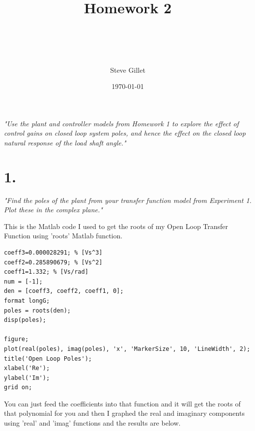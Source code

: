 \documentclass{article}
\title{Homework 2 \\ \className \\ \professorName \\ \taName}
\author{Steve Gillet}
\date{\today}
\begin{document}
\maketitle
\textit{
    "Use the plant and controller models from Homework 1 to explore the effect of control gains on
    closed loop system poles, and hence the effect on the closed loop natural response of the load
    shaft angle."
}

\section*{1.}

\textit{
    "Find the poles of the plant from your transfer function model from Experiment 1. Plot these
    in the complex plane."
}

This is the Matlab code I used to get the roots of my Open Loop Transfer Function using 'roots' Matlab function.

\begin{lstlisting}[style=matlabstyle]
coeff3=0.000028291; % [Vs^3]
coeff2=0.285890679; % [Vs^2]
coeff1=1.332; % [Vs/rad]
num = [-1];
den = [coeff3, coeff2, coeff1, 0];
format longG;
poles = roots(den);
disp(poles);

figure;
plot(real(poles), imag(poles), 'x', 'MarkerSize', 10, 'LineWidth', 2);
title('Open Loop Poles');
xlabel('Re');
ylabel('Im');
grid on;
\end{lstlisting}

You can just feed the coefficients into that function and it will get the roots of that polynomial for you and then I graphed the real and imaginary components using 'real' and 'imag' functions and the results are below.
\end{document}
